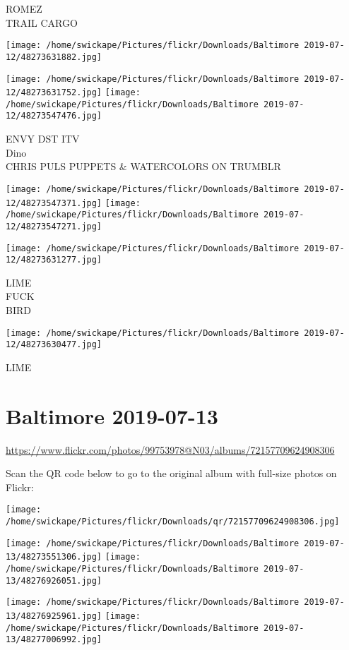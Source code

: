 \documentclass[10pt,letterpaper]{article}
\begin{document}
ROMEZ\\
TRAIL CARGO
\pagebreak

\texttt{[image: /home/swickape/Pictures/flickr/Downloads/Baltimore 2019-07-12/48273631882.jpg]}

\vspace{0.25in}
\texttt{[image: /home/swickape/Pictures/flickr/Downloads/Baltimore 2019-07-12/48273631752.jpg]}
\texttt{[image: /home/swickape/Pictures/flickr/Downloads/Baltimore 2019-07-12/48273547476.jpg]}

ENVY DST ITV\\
Dino\\
CHRIS PULS PUPPETS \& WATERCOLORS ON TRUMBLR
\pagebreak

\texttt{[image: /home/swickape/Pictures/flickr/Downloads/Baltimore 2019-07-12/48273547371.jpg]}
\texttt{[image: /home/swickape/Pictures/flickr/Downloads/Baltimore 2019-07-12/48273547271.jpg]}

\vspace{0.25in}
\texttt{[image: /home/swickape/Pictures/flickr/Downloads/Baltimore 2019-07-12/48273631277.jpg]}

LIME\\
FUCK\\
BIRD
\pagebreak

\texttt{[image: /home/swickape/Pictures/flickr/Downloads/Baltimore 2019-07-12/48273630477.jpg]}

LIME
\pagebreak

\section*{Baltimore 2019-07-13}

\url{https://www.flickr.com/photos/99753978@N03/albums/72157709624908306}

Scan the QR code below to go to the original album with full-size photos on Flickr:

\texttt{[image: /home/swickape/Pictures/flickr/Downloads/qr/72157709624908306.jpg]}
\pagebreak

\texttt{[image: /home/swickape/Pictures/flickr/Downloads/Baltimore 2019-07-13/48273551306.jpg]}
\texttt{[image: /home/swickape/Pictures/flickr/Downloads/Baltimore 2019-07-13/48276926051.jpg]}

\texttt{[image: /home/swickape/Pictures/flickr/Downloads/Baltimore 2019-07-13/48276925961.jpg]}
\texttt{[image: /home/swickape/Pictures/flickr/Downloads/Baltimore 2019-07-13/48277006992.jpg]}
\end{document}
